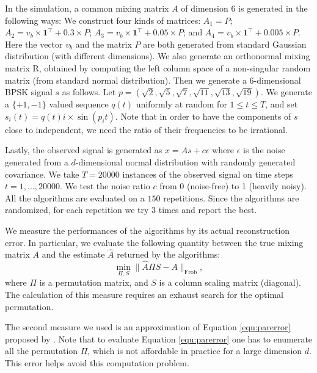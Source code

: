 \documentclass[jmlr]{article}
\theoremstyle{definition}
\begin{document}
In the simulation, a common mixing matrix $A$ of dimension 6 is generated in the following ways:
We construct four kinds of matrices:
$A_1 = P$; 
$A_2 = v_b\times\boldsymbol{1}^{\top} + 0.3\times P$;
$A_3 = v_b\times\boldsymbol{1}^{\top} + 0.05\times P$;
and $A_4 = v_b\times\boldsymbol{1}^{\top} + 0.005\times P$.
Here the vector $v_b$ and the matrix $P$ are both generated from standard Gaussian distribution (with different dimensions).
We also generate an orthonormal mixing matrix R, obtained by computing the left column space of a non-singular random matrix (from standard normal distribution).  
Then we generate a $6$-dimensional BPSK signal $s$ as follows. Let $p=(\sqrt{2},\sqrt{5},\sqrt{7},\sqrt{11},\sqrt{13},\sqrt{19})$.
We generate a $\{+1,-1\}$ valued sequence $q(t)$ uniformly at random for $1 \le t \le T$, and set
$s_i(t) = q(t) i\times\sin (p_i t)$.
Note that in order to have the components of $s$ close to independent, we need the ratio of their frequencies to be irrational. 

Lastly, the observed signal is generated as $x = As+c\epsilon$ where $\epsilon$ is the noise generated from a $d$-dimensional normal distribution with randomly generated covariance. 
We take $T=20000$ instances of the observed signal on time steps $t= 1,\ldots, 20000$.
We test the noise ratio $c$ from 0 (noise-free) to 1 (heavily noisy). 
All the algorithms are evaluated on a $150$ repetitions. 
Since the algorithms are randomized, for each repetition we try $3$ times and report the best.

We measure the performances of the algorithms by its actual reconstruction error.
In particular, we evaluate the following quantity between the true mixing matrix $A$ and the estimate $\hat{A}$ returned by the algorithms:
\begin{equation}
\label{equ:parerror}
\min_{\Pi,S} \|\hat{A}\Pi S - A\|_{\text{Frob}},
\end{equation}
where $\Pi$ is a permutation matrix, and $S$ is a column scaling matrix (diagonal).
The calculation of this measure requires an exhaust search for the optimal permutation.

The second measure we used is an approximation of Equation \eqref{equ:parerror} proposed by \citet{comon1994independent}. 
Note that to evaluate Equation \eqref{equ:parerror} one has to enumerate all the permutation $\Pi$, which is not affordable in practice for a large dimension $d$. 
This error helps avoid this computation problem. 
\end{document}
